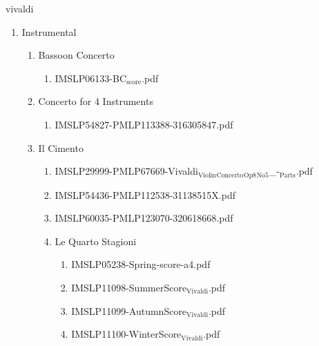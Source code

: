 \documentclass[11pt]{article}
\begin{document}
\item vivaldi
\label{sec-1-1-1-1-44-72}
\begin{enumerate}
\item Instrumental
\label{sec-1-1-1-1-44-72-1}
\begin{enumerate}
\item Bassoon Concerto
\label{sec-1-1-1-1-44-72-1-1}
\begin{enumerate}
\item IMSLP06133-BC$_{\text{score}}$.pdf
\label{sec-1-1-1-1-44-72-1-1-1}
\end{enumerate}

\item Concerto for 4 Instruments
\label{sec-1-1-1-1-44-72-1-2}
\begin{enumerate}
\item IMSLP54827-PMLP113388-316305847.pdf
\label{sec-1-1-1-1-44-72-1-2-1}
\end{enumerate}

\item Il Cimento
\label{sec-1-1-1-1-44-72-1-3}
\begin{enumerate}
\item IMSLP29999-PMLP67669-Vivaldi$_{\text{Violin}}$$_{\text{Concerto}}$$_{\text{Op8}}$$_{\text{No5}}$\_-$_{\text{Parts}}$.pdf
\label{sec-1-1-1-1-44-72-1-3-1}

\item IMSLP54436-PMLP112538-31138515X.pdf
\label{sec-1-1-1-1-44-72-1-3-2}

\item IMSLP60035-PMLP123070-320618668.pdf
\label{sec-1-1-1-1-44-72-1-3-3}

\item Le Quarto Stagioni
\label{sec-1-1-1-1-44-72-1-3-4}
\begin{enumerate}
\item IMSLP05238-Spring-score-a4.pdf
\label{sec-1-1-1-1-44-72-1-3-4-1}

\item IMSLP11098-SummerScore$_{\text{Vivaldi}}$.pdf
\label{sec-1-1-1-1-44-72-1-3-4-2}

\item IMSLP11099-AutumnScore$_{\text{Vivaldi}}$.pdf
\label{sec-1-1-1-1-44-72-1-3-4-3}

\item IMSLP11100-WinterScore$_{\text{Vivaldi}}$.pdf
\label{sec-1-1-1-1-44-72-1-3-4-4}
\end{enumerate}
\end{enumerate}


\end{enumerate}
\end{enumerate}
\end{document}
